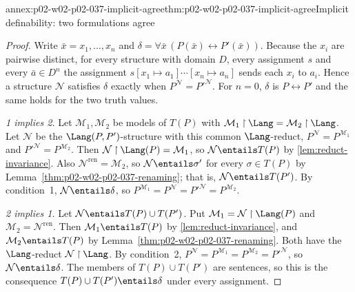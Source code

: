\begin{annexitem}{annex:p02-w02-p02-037-implicit-agree}{thm:p02-w02-p02-037-implicit-agree}{Implicit definability: two formulations agree}
\begin{proof}
Write \(\bar x=x_1,\ldots,x_n\) and
\(\delta=\forall\bar x\,(P(\bar x)\leftrightarrow P'(\bar x))\).  Because the
\(x_i\) are pairwise distinct, for every structure with domain \(D\), every
assignment \(s\) and every \(\bar a\in D^n\) the assignment
\(s[x_1\mapsto a_1]\cdots[x_n\mapsto a_n]\) sends each \(x_i\) to \(a_i\).
Hence a structure \(\mathcal N\) satisfies \(\delta\) exactly when
\(P^{\mathcal N}=P'^{\mathcal N}\).  For \(n=0\), \(\delta\) is
\(P\leftrightarrow P'\) and the same holds for the two truth values.

\emph{1 implies 2.}  Let \(\mathcal M_1,\mathcal M_2\) be models of
\(T(P)\) with \(\mathcal M_1\mathbin{\upharpoonright}\Lang=\mathcal M_2\mathbin{\upharpoonright}\Lang\).  Let
\(\mathcal N\) be the \(\Lang(P,P')\)-structure with this common
\(\Lang\)-reduct, \(P^{\mathcal N}=P^{\mathcal M_1}\) and
\(P'^{\mathcal N}=P^{\mathcal M_2}\).  Then
\(\mathcal N\mathbin{\upharpoonright}\Lang(P)=\mathcal M_1\), so \(\mathcal N\entails T(P)\) by
\cref{lem:reduct-invariance}.  Also \(\mathcal N^{\mathrm{ren}}=\mathcal M_2\), so
\(\mathcal N\entails\sigma'\) for every \(\sigma\in T(P)\) by
Lemma~\ref{thm:p02-w02-p02-037-renaming}; that is,
\(\mathcal N\entails T(P')\).  By condition~1,
\(\mathcal N\entails\delta\), so
\(P^{\mathcal M_1}=P^{\mathcal N}=P'^{\mathcal N}=P^{\mathcal M_2}\).

\emph{2 implies 1.}  Let \(\mathcal N\entails T(P)\cup T(P')\).  Put
\(\mathcal M_1=\mathcal N\mathbin{\upharpoonright}\Lang(P)\) and
\(\mathcal M_2=\mathcal N^{\mathrm{ren}}\).  Then \(\mathcal M_1\entails T(P)\) by
\cref{lem:reduct-invariance}, and \(\mathcal M_2\entails T(P)\) by
Lemma~\ref{thm:p02-w02-p02-037-renaming}.  Both have the \(\Lang\)-reduct
\(\mathcal N\mathbin{\upharpoonright}\Lang\).  By condition~2,
\(P^{\mathcal N}=P^{\mathcal M_1}=P^{\mathcal M_2}=P'^{\mathcal N}\), so
\(\mathcal N\entails\delta\).  The members of \(T(P)\cup T(P')\) are
sentences, so this is the consequence \(T(P)\cup T(P')\entails\delta\)
under every assignment.
\end{proof}
\end{annexitem}

